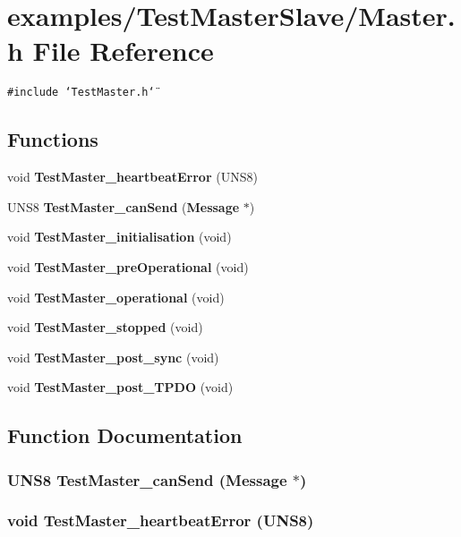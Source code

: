 \section{examples/Test\-Master\-Slave/Master.h File Reference}
\label{Master_8h}
{\tt \#include \char`\"{}Test\-Master.h\char`\"{}}\par
\subsection*{Functions}
\begin{CompactItemize}
\item 
void {\bf Test\-Master\_\-heartbeat\-Error} (UNS8)
\item 
UNS8 {\bf Test\-Master\_\-can\-Send} ({\bf Message} $\ast$)
\item 
void {\bf Test\-Master\_\-initialisation} (void)
\item 
void {\bf Test\-Master\_\-pre\-Operational} (void)
\item 
void {\bf Test\-Master\_\-operational} (void)
\item 
void {\bf Test\-Master\_\-stopped} (void)
\item 
void {\bf Test\-Master\_\-post\_\-sync} (void)
\item 
void {\bf Test\-Master\_\-post\_\-TPDO} (void)
\end{CompactItemize}


\subsection{Function Documentation}
\subsubsection{\setlength{\rightskip}{0pt plus 5cm}UNS8 Test\-Master\_\-can\-Send ({\bf Message} $\ast$)}\label{Master_8h_6c928d57139125b6aaadc9df4f337489}


\subsubsection{\setlength{\rightskip}{0pt plus 5cm}void Test\-Master\_\-heartbeat\-Error (UNS8)}\label{Master_8h_68bcbab35a7a058c874ac3af06cbf240}


